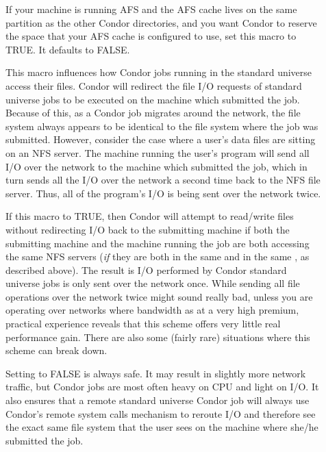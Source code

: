 \begin{description}
  
      
\item[] \label{param:ReserveAfsCache} If
  your machine is running AFS and the AFS cache lives on the same
  partition as the other Condor directories, and you want Condor to
  reserve the space that your AFS cache is configured to use, set this
  macro to TRUE.  It defaults to FALSE.
  
\item[] \label{param:UseNfs} This macro influences
  how Condor jobs running in the standard universe access their
  files.  Condor will redirect the file I/O requests
  of standard universe jobs to be executed on the machine which
  submitted the job.  Because of this, as a Condor job migrates around
  the network, the file system always appears to be identical to the
  file system where the job was submitted.  However, consider the case
  where a user's data files are sitting on an NFS server. The machine
  running the user's program will send all I/O over the network to the
  machine which submitted the job, which in turn sends all the I/O
  over the network a second time back to the NFS file server. Thus,
  all of the program's I/O is being sent over the network twice.
          
  If this macro to TRUE, then Condor will attempt to
  read/write files without redirecting I/O back to the submitting
  machine if both the submitting machine and the machine running the job
  are both accessing the same NFS servers (\emph{if} they are both in the
  same  and in the same ,
  as described above).  The result is I/O performed by Condor standard
  universe jobs is only sent over the network once.  
  While sending all file operations over the network twice might sound
  really bad, unless you are operating over networks where bandwidth
  as at a very high premium, practical experience reveals that this
  scheme offers very little real performance gain.  There are also
  some (fairly rare) situations where this scheme can break down.
  
  Setting  to FALSE is always safe.  It may result
  in slightly more network traffic, but Condor jobs are most often heavy
  on CPU and light on I/O.  It also ensures that a remote
  standard universe Condor job will always use Condor's remote system
  calls mechanism to reroute I/O and therefore see the exact same
  file system that the user sees on the machine where she/he submitted
  the job.
  

\end{description}
